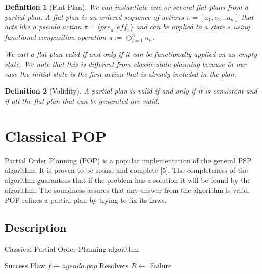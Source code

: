 \documentclass[]{article}
\newtheorem{definition}{Definition}
\begin{document}
\begin{definition}[Flat Plan]

We can instantiate one or several flat plans from a partial plan. A flat
plan is an ordered sequence of actions \(\pi = [ a_1, a_2 \ldots a_n]\)
that acts like a pseudo action
\(\pi = \langle pre_\pi, eff_\pi \rangle\) and can be applied to a state
\(s\) using functional composition operation
\(\pi := \bigcirc_{i=1}^n a_n\).

We call a flat plan valid if and only if it can be functionally applied
on an empty state. We note that this is different from classic state
planning because in our case the initial state is the first action that
is already included in the plan.

\end{definition}

\begin{definition}[Validity]

A partial plan is valid if and only if it is consistent and if all the
flat plan that can be generated are valid.

\end{definition}

\section{Classical POP}\label{classical-pop}

Partial Order Planning (POP) is a popular implementation of the general
PSP algorithm. It is proven to be sound and complete {[}5{]}. The
completeness of the algorithm guarantees that if the problem has a
solution it will be found by the algorithm. The soundness assures that
any answer from the algorithm is valid. POP refines a partial plan by
trying to fix its flaws.

\subsection{Description}\label{description}

\begin{algorithm}\caption{Classical Partial Order Planning algorithm}\label{pop}\begin{algorithmic}

\State {} 
 \State \Return Success
 \EndIf
    \State Flaw \(f\gets agenda.pop\)
 \State Resolvers \(R \gets\)
 
 
\State {} 
\State {}
\Else 
            \State {} \EndIf
    \EndFor
    \State \Return Failure 
\EndFunction

\end{algorithmic}\end{algorithm}
\end{document}
